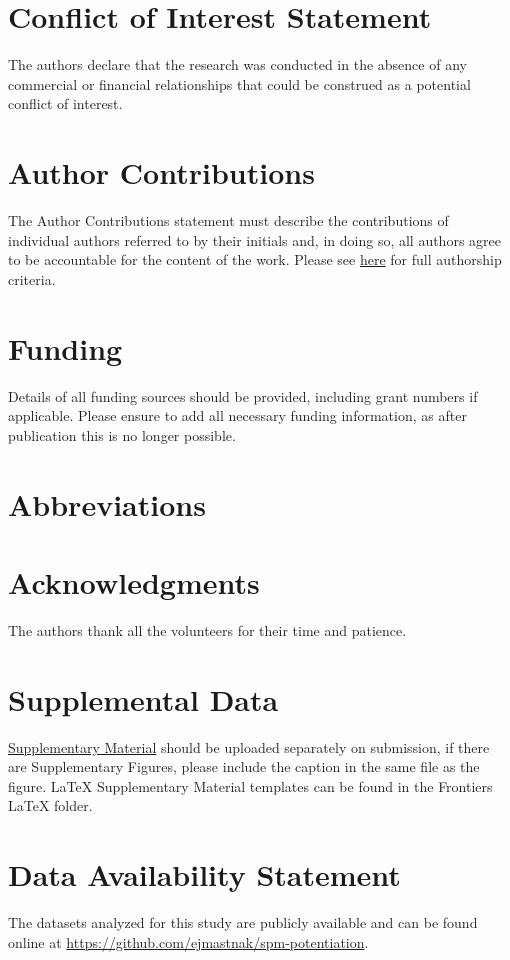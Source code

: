 \documentclass[utf8]{FrontiersinHarvard}
\begin{document}
\section*{Conflict of Interest Statement}
The authors declare that the research was conducted in the absence of any commercial or financial relationships that could be construed as a potential conflict of interest.

\section*{Author Contributions}
The Author Contributions statement must describe the contributions of individual authors referred to by their initials and, in doing so, all authors agree to be accountable for the content of the work.
Please see \href{https://www.frontiersin.org/about/policies-and-publication-ethics#AuthorshipAuthorResponsibilities}{here} for full authorship criteria.

\section*{Funding}
Details of all funding sources should be provided, including grant numbers if applicable.
Please ensure to add all necessary funding information, as after publication this is no longer possible.

\section*{Abbreviations}

\section*{Acknowledgments}
The authors thank all the volunteers for their time and patience.

\section*{Supplemental Data}
 \href{http://home.frontiersin.org/about/author-guidelines#SupplementaryMaterial}{Supplementary Material} should be uploaded separately on submission, if there are Supplementary Figures, please include the caption in the same file as the figure. LaTeX Supplementary Material templates can be found in the Frontiers LaTeX folder.

\section*{Data Availability Statement} \label{s:data_availability}
The datasets analyzed for this study are publicly available and can be found online at \url{https://github.com/ejmastnak/spm-potentiation}.



\end{document}
